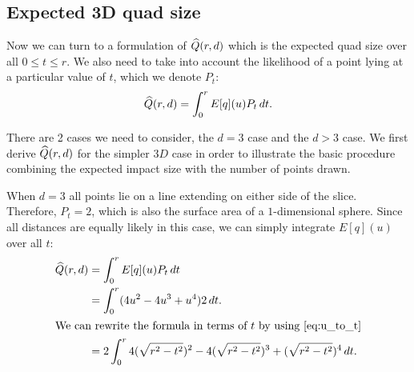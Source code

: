 \subsection{Expected 3D quad size}

Now we can turn to a formulation of $\widehat{Q}(r,d)$ which is the expected quad
size over all $0 \le t \le r$.  We also need to take into account the
likelihood of a point lying at a particular value of $t$, which we
denote $P_t$:
\begin{align*}
  \widehat{Q}(r,d) = \int_0^r E[q](u) P_t \, dt
  \text{.}
\end{align*}

There are 2 cases we need to consider, the $d=3$ case and the $d>3$ case.
We first derive $\widehat{Q}(r,d)$ for the simpler $3D$ case in order to illustrate
the basic procedure combining the expected impact size with the number of
points drawn.

When $d=3$ all points lie on a line extending on either side of the slice.
Therefore, $P_t = 2$, which is also the surface area of a $1$-dimensional
sphere.
Since all distances are equally likely in this case, we can simply integrate
$E[q](u)$ over all $t$:
\begin{align*}
\expfrags 
     &= \int_{0}^r E[q] (u) P_t \, dt \\
     &= \int_{0}^r (4u^2 - 4u^3 + u^4) 2 \, dt \text{.}\\
\intertext{We can rewrite the formula in terms of $t$ by using \autoref{eq:u_to_t}}
     &= 2 \int_{0}^r 
          4(\sqrt{r^2-t^2})^2 - 4(\sqrt{r^2-t^2})^3 + (\sqrt{r^2-t^2})^4 \, dt
          \text{.}
\end{align*}

